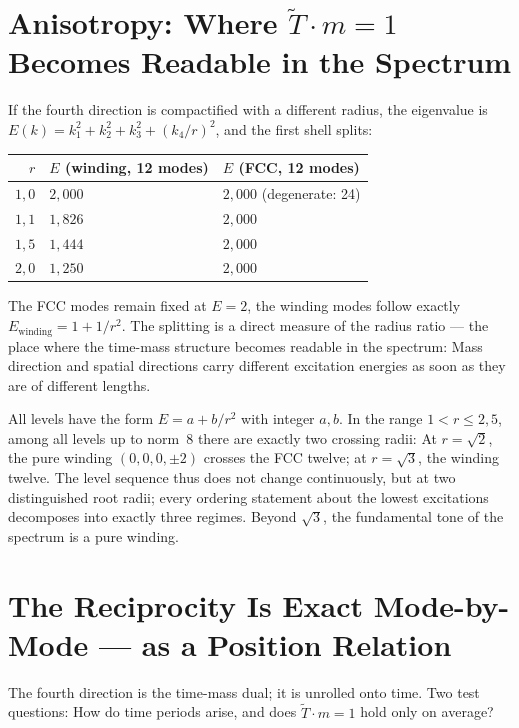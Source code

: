 \section{Anisotropy: Where $\tilde T\cdot m = 1$ Becomes Readable in the Spectrum}

If the fourth direction is compactified with a different radius, the
eigenvalue is $E(k) = k_1^2+k_2^2+k_3^2+(k_4/r)^2$, and the first shell
splits:

\begin{center}
\small
\begin{tabular}{rll}
\toprule
$r$ & $E$ (winding, 12 modes) & $E$ (FCC, 12 modes) \\
\midrule
$1{,}0$ & $2{,}000$ & $2{,}000$ (degenerate: 24) \\
$1{,}1$ & $1{,}826$ & $2{,}000$ \\
$1{,}5$ & $1{,}444$ & $2{,}000$ \\
$2{,}0$ & $1{,}250$ & $2{,}000$ \\
\bottomrule
\end{tabular}
\end{center}

The FCC modes remain fixed at $E = 2$, the winding modes follow exactly
$E_{\mathrm{winding}} = 1+1/r^2$. The splitting is a direct measure
of the radius ratio --- the place where the time-mass structure
becomes readable in the spectrum: Mass direction and spatial directions carry
different excitation energies as soon as they are of different lengths.

All levels have the form $E = a+b/r^2$ with integer $a,b$. In the
range $1<r\le2{,}5$, among all levels up to norm~8 there are exactly two
crossing radii: At $r = \sqrt2$, the pure winding
$(0,0,0,\pm2)$ crosses the FCC twelve; at $r = \sqrt3$, the winding twelve.
The level sequence thus does not change continuously, but at two
distinguished root radii; every ordering statement about the lowest
excitations decomposes into exactly three regimes. Beyond $\sqrt3$, the
fundamental tone of the spectrum is a pure winding.

\section{The Reciprocity Is Exact Mode-by-Mode --- as a Position Relation}

The fourth direction is the time-mass dual; it is unrolled onto time.
Two test questions: How do time periods arise, and does $\tilde T\cdot m = 1$
hold only on average?

